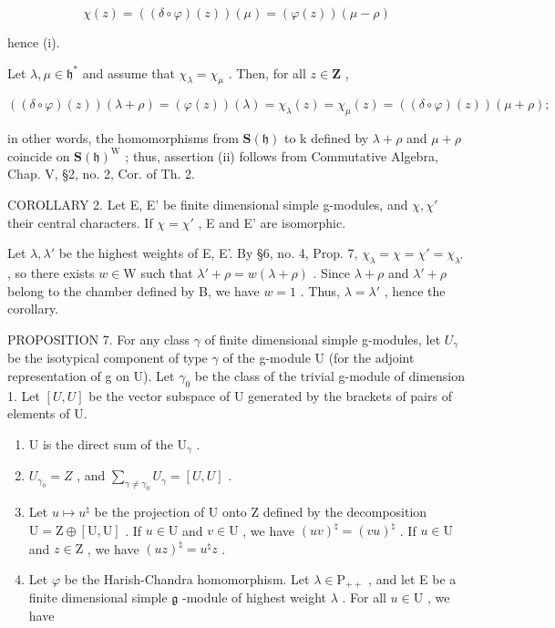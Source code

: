 \[
\chi (z) = ((\delta \circ \varphi) (z)) (\mu) = (\varphi (z)) (\mu - \rho)
\]

hence (i).

Let \(\lambda, \mu \in \mathfrak{h}^*\) and assume that \(\chi_{\lambda} = \chi_{\mu}\) . Then, for all \(z \in \mathbf{Z}\) ,

\[
((\delta \circ \varphi) (z)) (\lambda + \rho) = (\varphi (z)) (\lambda) = \chi_ {\lambda} (z) = \chi_ {\mu} (z) = ((\delta \circ \varphi) (z)) (\mu + \rho);
\]

in other words, the homomorphisms from \(\mathbf{S}(\mathfrak{h})\) to k defined by \(\lambda + \rho\) and \(\mu + \rho\) coincide on \(\mathbf{S}(\mathfrak{h})^{\mathrm{W}}\) ; thus, assertion (ii) follows from Commutative Algebra, Chap. V, §2, no. 2, Cor. of Th. 2.

COROLLARY 2. Let E, E' be finite dimensional simple g-modules, and \(\chi, \chi'\) their central characters. If \(\chi = \chi'\) , E and E' are isomorphic.

Let \(\lambda, \lambda'\) be the highest weights of E, E'. By §6, no. 4, Prop. 7, \(\chi_{\lambda} = \chi = \chi' = \chi_{\lambda'}\) , so there exists \(w \in \mathrm{W}\) such that \(\lambda' + \rho = w(\lambda + \rho)\) . Since \(\lambda + \rho\) and \(\lambda' + \rho\) belong to the chamber defined by B, we have \(w = 1\) . Thus, \(\lambda = \lambda'\) , hence the corollary.

PROPOSITION 7. For any class \(\gamma\) of finite dimensional simple g-modules, let \(U_{\gamma}\) be the isotypical component of type \(\gamma\) of the g-module U (for the adjoint representation of g on U). Let \(\gamma_{0}\) be the class of the trivial g-module of dimension 1. Let \([U,U]\) be the vector subspace of U generated by the brackets of pairs of elements of U.

\begin{enumerate}
\def\labelenumi{(\roman{enumi})}
\item
  U is the direct sum of the \(\mathrm{U}_{\gamma}\) .
\item
  \(U_{\gamma_{0}} = Z\) , and \(\sum_{\gamma \neq \gamma_{0}} U_{\gamma} = [U, U]\) .
\item
  Let \(u \mapsto u^{\natural}\) be the projection of U onto Z defined by the decomposition \(\mathrm{U} = \mathrm{Z} \oplus [\mathrm{U}, \mathrm{U}]\) . If \(u \in \mathrm{U}\) and \(v \in \mathrm{U}\) , we have \((uv)^{\natural} = (vu)^{\natural}\) . If \(u \in \mathrm{U}\) and \(z \in \mathrm{Z}\) , we have \((uz)^{\natural} = u^{\natural}z\) .
\item
  Let \(\varphi\) be the Harish-Chandra homomorphism. Let \(\lambda \in \mathrm{P}_{++}\) , and let E be a finite dimensional simple \(\mathfrak{g}\) -module of highest weight \(\lambda\) . For all \(u \in \mathrm{U}\) , we have
\end{enumerate}

